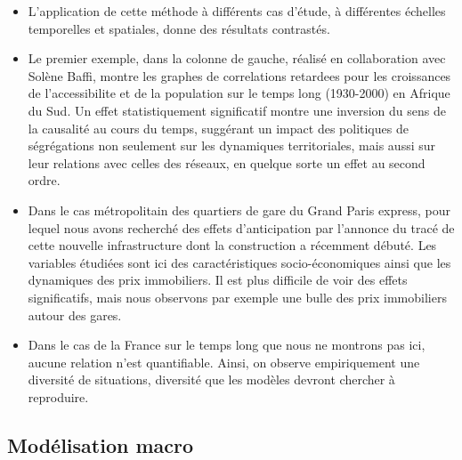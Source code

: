 \documentclass[11pt]{article}
\begin{document}
\begin{itemize}
	\item L'application de cette méthode à différents cas d'étude, à différentes échelles temporelles et spatiales, donne des résultats contrastés.
	\item Le premier exemple, dans la colonne de gauche, réalisé en collaboration avec Solène Baffi, montre les graphes de correlations retardees pour les croissances de l'accessibilite et de la population sur le temps long (1930-2000) en Afrique du Sud. Un effet statistiquement significatif montre une inversion du sens de la causalité au cours du temps, suggérant un impact des politiques de ségrégations non seulement sur les dynamiques territoriales, mais aussi sur leur relations avec celles des réseaux, en quelque sorte un effet au second ordre.
	\item Dans le cas métropolitain des quartiers de gare du Grand Paris express, pour lequel nous avons recherché des effets d'anticipation par l'annonce du tracé de cette nouvelle infrastructure dont la construction a récemment débuté. Les variables étudiées sont ici des caractéristiques socio-économiques ainsi que les dynamiques des prix immobiliers. Il est plus difficile de voir des effets significatifs, mais nous observons par exemple une bulle des prix immobiliers autour des gares.
	\item Dans le cas de la France sur le temps long que nous ne montrons pas ici, aucune relation n'est quantifiable. Ainsi, on observe empiriquement une diversité de situations, diversité que les modèles devront chercher à reproduire.
\end{itemize}




\subsection*{Modélisation macro}

\end{document}
